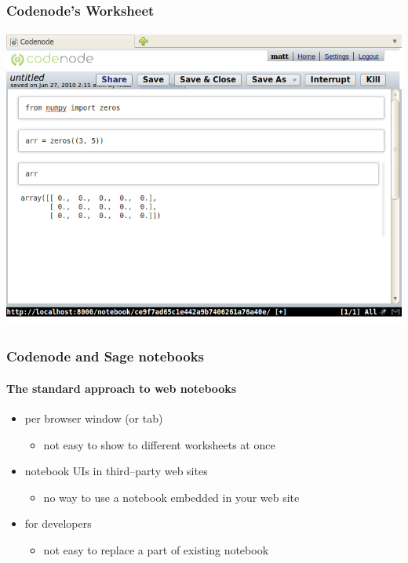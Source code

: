 \documentclass{beamer}
\begin{document}
\begin{frame}
    \frametitle{Codenode's Worksheet}
    \framesubtitle{}

    \begin{center}
        \includegraphics[scale=0.45]{images/codenode-worksheet.png}
    \end{center}
\end{frame}

\begin{frame}
    \frametitle{Codenode and Sage notebooks}
    \framesubtitle{The standard approach to web notebooks}

    \begin{itemize}
        \item {} per browser window (or tab)
            \begin{itemize}
                \pause
                \item not easy to show to different worksheets at once
            \end{itemize}
        \pause
        \item notebook UIs  in third--party web sites
            \begin{itemize}
                \pause
                \item no way to use a notebook embedded in your web site
            \end{itemize}
        \pause
        \item {} for developers
            \begin{itemize}
                \pause
                \item not easy to replace a part of existing notebook
            \end{itemize}
    \end{itemize}
\end{frame}
\end{document}
